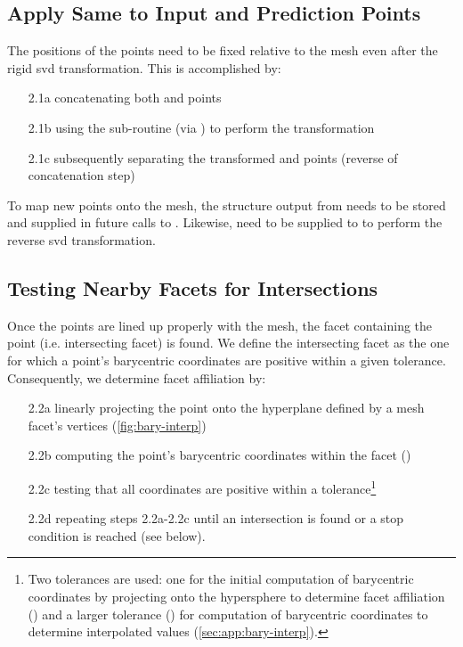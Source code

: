 \documentclass[final,12pt]{elsarticle}
\begin{document}
\subsection{Apply Same  to Input and Prediction Points}
\label{sec:app:bary:int:out-svd}
The positions of the \outpt{} points need to be fixed relative to the mesh even after the rigid \gls{svd} transformation. %
This is accomplished by:
\begin{itemize}%
	\item[2.1a] concatenating both \inpt{} and
	\outpt{} points
	\item[2.1b] using the  sub-routine  (via ) to perform the transformation
	\item[2.1c] subsequently separating the transformed \inpt{} and \outpt{} points (reverse of concatenation step)
\end{itemize}

To map new points onto the mesh, the  structure output from  needs to be stored and supplied in future calls to . Likewise,  need to be supplied to  to perform the reverse \gls{svd} transformation.

\subsection{Testing Nearby Facets for Intersections}
\label{sec:app:bary:int:facets}
Once the \outpt{} points are lined up properly with the mesh, the facet containing the \outpt{} point (i.e. intersecting facet) is found. We define the intersecting facet as the one for which a point's barycentric coordinates are positive within a given tolerance. Consequently, we determine facet affiliation by:
\begin{enumerate}%
	\item[2.2a] linearly projecting the \outpt{} point onto the hyperplane defined by a mesh facet's vertices (\cref{fig:bary-interp})
	\item[2.2b] computing the point's barycentric coordinates within the facet \cite{anatoliyCheckIfRay2015,skalaRobustBarycentricCoordinates2013} ()
	\item[2.2c] testing that all coordinates are positive \cite{langerSphericalBarycentricCoordinates2006} within a tolerance\footnote{Two tolerances are used: one for the initial computation of barycentric coordinates by projecting onto the hypersphere to determine facet affiliation () and a larger tolerance () for computation of barycentric coordinates to determine interpolated values (\cref{sec:app:bary-interp}). }
	\item[2.2d] repeating steps 2.2a-2.2c until an intersection is found or a stop condition is reached (see  below).
\end{enumerate}
\end{document}
